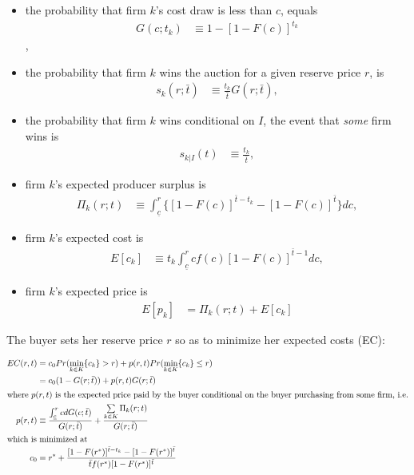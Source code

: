 \documentclass[11pt,numbers=noenddot,pointlessnumbers]{scrreprt}
\numberwithin{equation}{section}
\begin{document}
\begin{itemize}
\item the probability that firm $k$'s cost draw is less than $c$, equals
\begin{align}
 G(c;t_k)&\equiv 1-[1-F(c)]^{t_k}
\end{align},
\item the probability that firm $k$ wins the auction
  for a given reserve price $r$, is
\begin{align}
 s_k(r;\bar{t}) &\equiv \frac{t_k}{\bar{t}}G(r;\bar{t}),
\end{align}
\item the probability that firm $k$ wins conditional on $I$, the event
  that \emph{some} firm wins is
\begin{align}
  s_{k|I}(t) &\equiv \frac{t_k}{\bar{t}},
\end{align}
\item firm $k$'s expected producer surplus is
\begin{align}
  \Pi_k(r;t)&\equiv \int_{\underline{c}}^r\{[1-F(c)]^{\bar{t}-t_k} - [1-F(c)]^{\bar{t}}\}dc,
\end{align}
\item firm $k$'s expected  cost is
\begin{align}
  E[c_k]&\equiv t_k\int_{\underline{c}}^rcf(c)[1-F(c)]^{\bar{t}-1}dc,
\end{align}
\item firm $k$'s expected  price is
\begin{align}
  E[p_k]&=\Pi_k(r;t) +  E[c_k]
\end{align}
\end{itemize}


The buyer sets her reserve price $r$ so as to minimize her expected costs (EC):

\begin{align}
  EC(r,t)&= c_0Pr(\min\limits_{k\in K}\{c_k\} >
  r)+p(r,t)Pr(\min\limits_{k\in K}\{c_k\} \le r) \nonumber\\
         &= c_0(1-G(r;\bar{t})) + p(r,t)G(r;\bar{t}) \nonumber\\
\intertext{where $p(r,t)$ is the expected price paid by the buyer
  conditional on the buyer purchasing from some firm, i.e.}
p(r,t)&\equiv
\frac{\int_{\underline{c}}^rcdG(c;\bar{t})}{G(r;\bar{t})} +
\frac{\sum\limits_{k\in K}\Pi_k(r;t)}{G(r;\bar{t})} \nonumber\\
\intertext{which is minimized at}
c_0 &=  r^{\ast} + \frac{[1-F(r^{\ast})]^{\bar{t}-t_k} - [1-F(r^{\ast})]^{\bar{t}}}{\bar{t}f(r^{\ast})[1-F(r^{\ast})]^{\bar{t}}}
\end{align}
\end{document}
